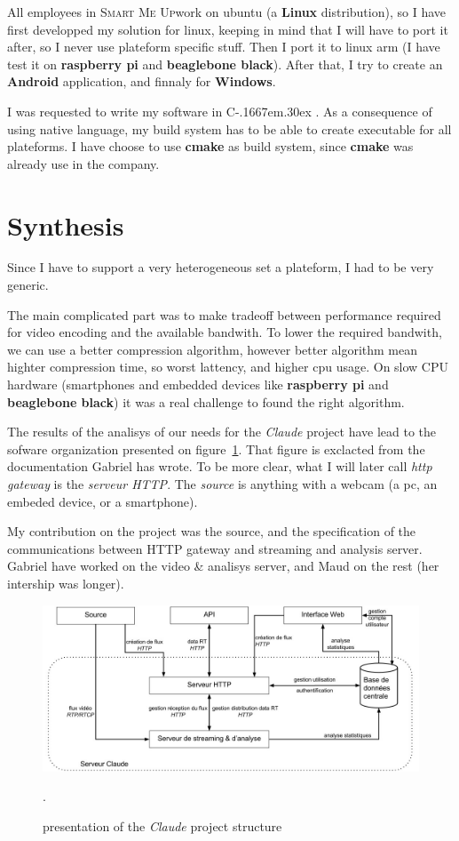 \documentclass[a4paper,11pt]{custom}
\newcommand{\smu}{\textsc{Smart Me Up}}
\newcommand{\cmake}{\textbf{cmake}\xspace}
\newcommand{\rpi}{\textbf{raspberry pi}\xspace}
\newcommand{\bbb}{\textbf{beaglebone black}\xspace}
\newcommand{\linux}{\textbf{Linux}\xspace}
\newcommand{\win}{\textbf{Windows}\xspace}
\newcommand{\android}{\textbf{Android}\xspace}
\newcommand{\claude}{\textit{Claude}\xspace}
\newcommand{\cpp}{%
  C\kern-.1667em\raise.30ex\hbox{\smaller{++}\xspace}%
  \spacefactor1000%
}
\begin{document}
All employees in \smu work on ubuntu (a \linux{} distribution), so I have first
developped my solution for linux, keeping in mind that I will have to port it
after, so I never use plateform specific stuff. Then I port it to linux arm (I
have test it on \rpi{} and \bbb). After that, I try to create an \android{}
application, and finnaly for \win.

I was requested to write my software in \cpp. As a consequence of using native
language, my build system has to be able to create executable for all
plateforms. I have choose to use \cmake{} as build system, since \cmake{} was
already use in the company.

\section{Synthesis}

Since I have to support a very heterogeneous set a plateform, I had to be very
generic.

The main complicated part was to make tradeoff between performance required for
video encoding and the available bandwith. To lower the required bandwith, we
can use a better compression algorithm, however better algorithm mean highter
compression time, so worst lattency, and higher cpu usage. On slow CPU hardware
(smartphones and embedded devices like \rpi{} and \bbb{}) it was a real
challenge to found the right algorithm.

The results of the analisys of our needs for the \claude{} project have lead to
the sofware organization presented on figure~\ref{fig:architecture}. That figure
is exclacted from the documentation Gabriel has wrote. To be more clear, what I
will later call \textit{http gateway} is the \textit{serveur HTTP}. The \textit{source} is anything
with a webcam (a pc, an embeded device, or a smartphone).

My contribution on the project was the source, and the specification of the
communications between HTTP gateway and streaming and analysis server. Gabriel
have worked on the video \& analisys server, and Maud on the rest (her intership
was longer).

\begin{figure}
  \centering
  \includegraphics[width=\textwidth]{architecture.jpg}
  \label{fig:architecture}
  \caption{presentation of the \claude{} project structure}.
\end{figure}
\end{document}
